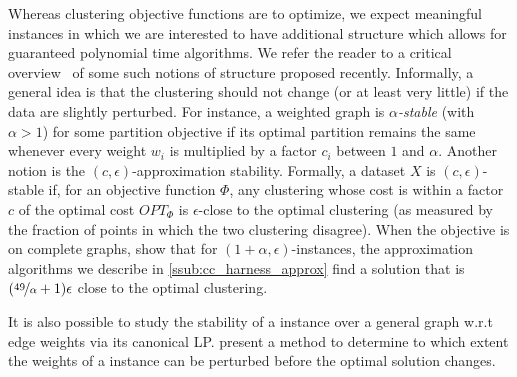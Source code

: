 Whereas clustering objective functions are \NPh{} to optimize, we expect meaningful instances
in which we are interested to have additional structure which allows for guaranteed polynomial time
algorithms. We refer the reader to a critical overview~\autocite{clusteringFeasibility15} of some
such notions of structure proposed recently. Informally, a general idea is that the clustering should not
change (or at least very little) if the data are slightly perturbed. For instance, a weighted graph
is \emph{$\alpha$-stable} (with $\alpha>1$) for some partition objective if its optimal partition
remains the same whenever every weight $w_i$ is multiplied by a factor $c_i$ between $1$ and
$\alpha$.
Another notion is the $(c, \epsilon)$-approximation stability. Formally, a dataset $X$ is $(c,
\epsilon)$-stable if, for an objective function $\Phi$, any clustering whose cost is within a factor
$c$ of the optimal cost $OPT_{\Phi}$ is $\epsilon$-close to the optimal clustering (as measured by
the fraction of points in which the two clustering disagree). When the objective is \mind{} on
complete graphs, \textcite{StableCC09} show that for $(1+\alpha, \epsilon)$-instances, the
approximation algorithms we describe in \autoref{ssub:cc_harness_approx} find a solution that is
$(\nicefrac{49}{\alpha} + 1)\epsilon$ close to the optimal clustering.

It is also possible to study the stability of a \pcc{} instance over a general graph w.r.t edge
weights via its canonical \mind{} LP. \Textcite{StableLP09} present a method to determine to which
extent the weights of a \pcc{} instance can be perturbed before the optimal solution changes.

